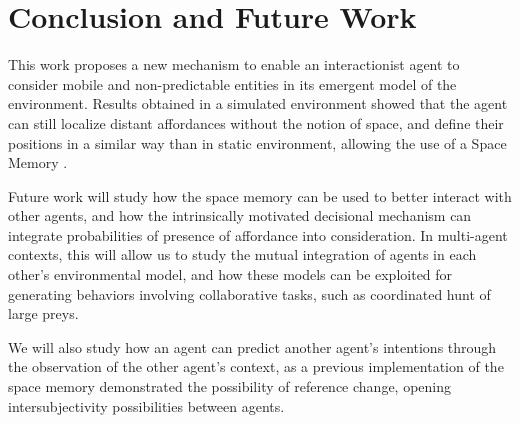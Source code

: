 \documentclass[conference]{IEEEtran}
\makeatletter
\let\cite\relax
\DeclareRobustCommand{\cite}{%
	\let\new@cite@pre\@gobble
	\@ifnextchar[\new@cite{\@citex[]}}
\def\new@cite[#1]{\@ifnextchar[{\new@citea{#1}}{\@citex[#1]}}
\def\new@citea#1{\def\new@cite@pre{#1}\@citex}
\makeatother
\begin{document}
\section{Conclusion and Future Work}\label{conclusion}

This work proposes a new mechanism to enable an interactionist agent to consider mobile and non-predictable entities in its emergent model of the environment. 
Results obtained in a simulated environment showed that the agent can still localize distant affordances without the notion of space, and define their positions in a similar way than in static environment, allowing the use of a Space Memory \cite{gay:space}.

Future work will study how the space memory can be used to better interact with other agents, and how the intrinsically motivated decisional mechanism can integrate probabilities of presence of affordance into consideration.
In multi-agent contexts, this will allow us to study the mutual integration of agents in each other's environmental model, and how these models can be exploited for generating behaviors involving collaborative tasks, such as coordinated hunt of large preys. 

We will also study how an agent can predict another agent's intentions through the observation of the other agent's context, as a previous implementation of the space memory demonstrated the possibility of reference change, opening intersubjectivity possibilities between agents.




\end{document}

